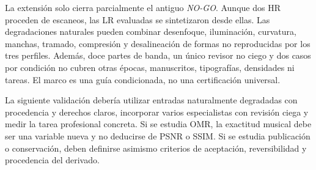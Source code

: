 La extensión solo cierra parcialmente el antiguo \emph{NO-GO}. Aunque dos HR proceden de escaneos,
las LR evaluadas se sintetizaron desde ellas. Las degradaciones naturales pueden combinar
desenfoque, iluminación, curvatura, manchas, tramado, compresión y desalineación de formas no
reproducidas por los tres perfiles. Además, doce partes de banda, un único revisor no ciego y dos
casos por condición no cubren otras épocas, manuscritos, tipografías, densidades ni tareas. El marco
es una guía condicionada, no una certificación universal.

La siguiente validación debería utilizar entradas naturalmente degradadas con procedencia y
derechos claros, incorporar varios especialistas con revisión ciega y medir la tarea profesional
concreta. Si se estudia OMR, la exactitud musical debe ser una variable nueva y no deducirse de PSNR
o SSIM. Si se estudia publicación o conservación, deben definirse asimismo criterios de aceptación,
reversibilidad y procedencia del derivado.
